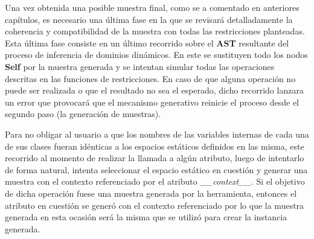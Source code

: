 Una vez obtenida una posible muestra final, como se a comentado en anteriores capítulos, es necesario una última fase en la que se
revisará detalladamente la coherencia y compatibilidad de la muestra con todas las restricciones planteadas. Esta última fase consiste
en un último recorrido sobre el {\bf AST} resultante del proceso de inferencia de dominios dinámicos. En este se sustituyen todo los nodos
    {\bf Self} por la muestra generada y se intentan simular todas las operaciones descritas en las funciones de restricciones. En caso de que
alguna operación no puede ser realizada o que el resultado no sea el esperado, dicho recorrido lanzara un error que provocará que el
mecanismo generativo reinicie el proceso desde el segundo paso (la generación de muestras).

Para no obligar al usuario a que los nombres de las variables internas de cada una de sus clases fueran idénticas a los espacios
estáticos definidos en las misma, este recorrido al momento de realizar la llamada a algún atributo, luego de intentarlo de forma
natural, intenta seleccionar el espacio estático en cuestión y generar una muestra con el contexto referenciado por el atributo
    {\it \_\_context\_\_}. Si el objetivo de dicha operación fuese una muestra generada por la herramienta, entonces el atributo en cuestión se
generó con el contexto referenciado por lo que la muestra generada en esta ocasión será la misma que se utilizó para crear la instancia
generada.
